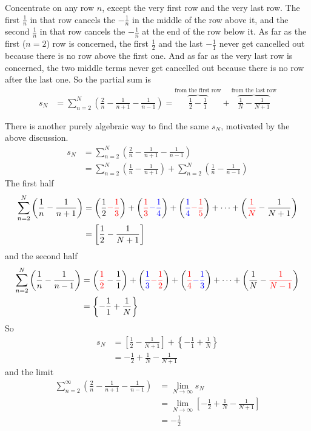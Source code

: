 \begin{solution}
Concentrate on any row $n$, except the very first row and the very last row. 
The first $\frac{1}{n}$ in that row cancels the $-\frac{1}{n}$ in the middle of the row above it, and the second $\frac{1}{n}$ in that row cancels the $-\frac{1}{n}$ at the end of the row below it.
As far as the first ($n=2$) row is concerned, the first $\frac{1}{2}$ and the last $-\frac{1}{1}$ never get cancelled out because there is no row above the first one.
And as far as the very last row is concerned, the two middle terms never get cancelled out because there is no row after the last one.
So the partial sum is
\begin{align*}
s_N&=\sum_{n=2}^N \left(\frac{2}{n}-\frac{1}{n+1}-\frac{1}{n-1} \right)
=\overbrace{\frac{1}{2}-\frac{1}{1}}^{\text{from the first row}}
 +\overbrace{\frac{1}{N}-\frac{1}{N+1}}^{\text{from the last row}}
\end{align*}

There is another purely algebraic way to find the same $s_N$, motivated by the above discussion.
\begin{align*}
s_N&=\sum_{n=2}^N \left(\frac{2}{n}-\frac{1}{n+1}-\frac{1}{n-1} \right) \\
&=\sum_{n=2}^N \left(\frac{1}{n}-\frac{1}{n+1}\right) +\sum_{n=2}^N\left(\frac{1}{n}-\frac{1}{n-1} \right) 
\end{align*}
The first half
\begin{align*}
\sum_{n=2}^N \left(\frac{1}{n}-\frac{1}{n+1}\right)
&=\left(\frac{1}{2}{\color{red}{-\frac{1}{3}}}\right) + \left({\color{red}{\frac{1}{3}}} {\color{blue}{-\frac{1}{4}}}\right) + \left({\color{blue}{\frac{1}{4}}}{\color{red}{-\frac{1}{5}}}\right) + \cdots +\left({\color{red}{\frac{1}{N}}}-\frac{1}{N+1}\right) \\
&=\left[\frac{1}{2}-\frac{1}{N+1}\right]
\end{align*}
and the second half
\begin{align*}
\sum_{n=2}^N\left(\frac{1}{n}-\frac{1}{n-1} \right)
&=\left({\color{red}{\frac{1}{2}}}-\frac{1}{1} \right) + \left({\color{blue}{\frac{1}{3}}}{\color{red}{-\frac{1}{2}}} \right) + \left({\color{red}{\frac{1}{4}}}{\color{blue}{-\frac{1}{3}}}\right) +\cdots + \left(\frac{1}{N}-{\color{red}{\frac{1}{N-1}}} \right) \\
&=\left\{-\frac{1}{1}+\frac{1}{N}\right\}
\end{align*}
So 
\begin{align*}
s_N&=\left[\frac{1}{2}-\frac{1}{N+1}\right]+\left\{-\frac{1}{1}+\frac{1}{N}\right\} \\
   &=-\frac{1}{2}+\frac{1}{N}-\frac{1}{N+1}
\end{align*}
and the limit
\begin{align*}
\sum_{n=2}^\infty \left(\frac{2}{n}-\frac{1}{n+1}-\frac{1}{n-1} \right)&=\lim_{N \to \infty}s_N\\&=\lim_{N \to \infty} \left[-\frac{1}{2}         
                               +\frac{1}{N}-\frac{1}{N+1}\right]\\
&=-\frac{1}{2}
\end{align*}

\end{solution}
